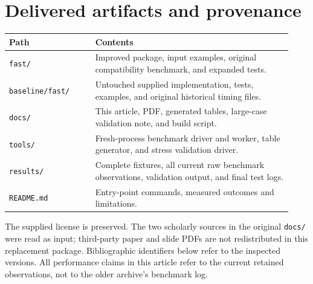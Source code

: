 \documentclass[11pt]{article}
\theoremstyle{remark}\newtheorem{remark}[theorem]{Remark}
\begin{document}
\section{Delivered artifacts and provenance}
\begin{center}\small
\begin{tabular}{@{}p{0.29\linewidth}p{0.64\linewidth}@{}}\toprule
Path & Contents \\\midrule
\texttt{fast/} & Improved package, input examples, original compatibility benchmark, and expanded tests.\\
\texttt{baseline/fast/} & Untouched supplied implementation, tests, examples, and original historical timing files.\\
\texttt{docs/} & This article, PDF, generated tables, large-case validation note, and build script.\\
\texttt{tools/} & Fresh-process benchmark driver and worker, table generator, and stress validation driver.\\
\texttt{results/} & Complete fixtures, all current raw benchmark observations, validation output, and final test logs.\\
\texttt{README.md} & Entry-point commands, measured outcomes and limitations.\\
\bottomrule\end{tabular}
\end{center}
The supplied license is preserved. The two scholarly sources in the original
\texttt{docs/} were read as input; third-party paper and slide PDFs are not
redistributed in this replacement package. Bibliographic identifiers below
refer to the inspected versions. All performance claims in this article
refer to the current retained observations, not to the older archive's
benchmark log.
\end{document}
